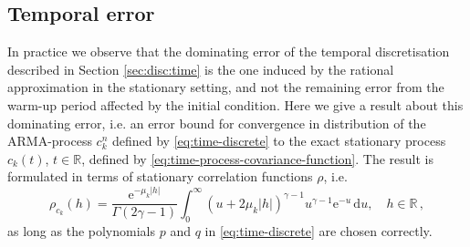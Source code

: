 \documentclass[12pt]{article} %
\begin{document}
\subsection{Temporal error}\label{sec:theory:time}

In practice we observe that the dominating error of the temporal discretisation described in Section \ref{sec:disc:time} is the one induced by the rational approximation in the stationary setting, and not the remaining error from the warm-up period affected by the initial condition. Here we give a result about this dominating error, i.e. an error bound for convergence in distribution of the ARMA-process $c_k^n$ defined by \eqref{eq:time-discrete} to the exact stationary process $c_k(t)$, $t\in\mathbb{R}$, defined by \eqref{eq:time-process-covariance-function}. The result is formulated in terms of stationary correlation functions $\rho$, i.e.
\begin{equation} \label{process-correlation-function}
\rho_{c_k}(h) = \frac{\mathrm{e}^{-\mu_k |h|} }{\Gamma(2 \gamma - 1)} \int_0^\infty (u + 2 \mu_k |h|)^{\gamma - 1} u^{\gamma - 1} \mathrm{e}^{-u} \, \mathrm{d} u, \quad h\in\mathbb{R} \, ,\end{equation}
as long as the polynomials $p$ and $q$ in \eqref{eq:time-discrete} are chosen correctly. 
\end{document}
